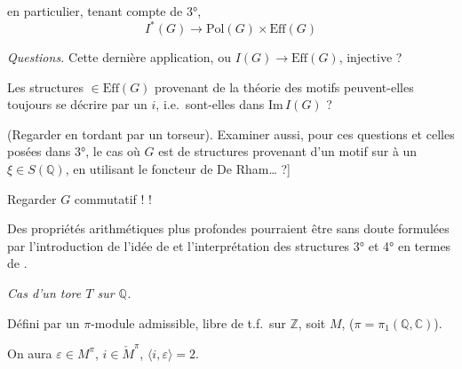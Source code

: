 \documentclass[11pt,a4paper]{article}
\begin{document}
 en particulier, tenant compte de 3°,
\[
  I^{*}(G) \longrightarrow \mathrm{Pol}(G) \times \mathrm{Eff}(G)
\]

\emph{Questions.} Cette dernière application, ou
$I(G) \to \mathrm{Eff}(G)$, injective ?

Les structures $\in \mathrm{Eff}(G)$ provenant de la théorie des motifs
peuvent-elles toujours se décrire par un $i$, i.e.\ sont-elles dans
$\mathrm{Im}\, I(G)$ ?

(Regarder \ill{} en tordant par un torseur). Examiner aussi, pour ces
questions et celles posées dans 3°, le cas où $G$ est \ill{} de structures
provenant d'un motif sur \ill{}  à un
$\xi \in S(\mathbb{Q})$, en utilisant le foncteur de De Rham… ?]


Regarder $G$ commutatif !  !

Des propriétés arithmétiques plus profondes pourraient être sans doute
formulées par l'introduction de l'idée de  et
l'interprétation des structures 3° et 4° en termes de \ill{}
.

 

\emph{Cas d'un tore $T$ sur $\mathbb{Q}$.}

Défini par un $\pi$-module admissible, libre de t.f.\ sur $\mathbb{Z}$,
soit $M$, ($\pi = \pi_{1}(\mathbb{Q}, \mathbb{C})$).

On aura $\varepsilon \in M^{\pi}$, $i \in \check{M}^{\pi}$,
$\langle i, \varepsilon \rangle = 2$.
\end{document}
